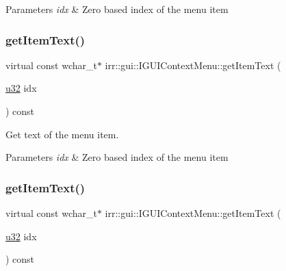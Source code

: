 \begin{DoxyParams}{Parameters}
{\em idx} & Zero based index of the menu item \\
\hline
\end{DoxyParams}
\mbox{\label{classirr_1_1gui_1_1IGUIContextMenu_a18cf836d001f425f617c5a36db3d1ae6}} 
\subsubsection{\texorpdfstring{get\+Item\+Text()}{getItemText()}\hspace{0.1cm}{\footnotesize\ttfamily [1/2]}}
{\footnotesize\ttfamily virtual const wchar\+\_\+t$\ast$ irr\+::gui\+::\+I\+G\+U\+I\+Context\+Menu\+::get\+Item\+Text (\begin{DoxyParamCaption}\item[{\hyperlink{namespaceirr_a0416a53257075833e7002efd0a18e804}{u32}}]{idx }\end{DoxyParamCaption}) const\hspace{0.3cm}{\ttfamily [pure virtual]}}



Get text of the menu item. 


\begin{DoxyParams}{Parameters}
{\em idx} & Zero based index of the menu item \\
\hline
\end{DoxyParams}
\mbox{\label{classirr_1_1gui_1_1IGUIContextMenu_a18cf836d001f425f617c5a36db3d1ae6}} 
\subsubsection{\texorpdfstring{get\+Item\+Text()}{getItemText()}\hspace{0.1cm}{\footnotesize\ttfamily [2/2]}}
{\footnotesize\ttfamily virtual const wchar\+\_\+t$\ast$ irr\+::gui\+::\+I\+G\+U\+I\+Context\+Menu\+::get\+Item\+Text (\begin{DoxyParamCaption}\item[{\hyperlink{namespaceirr_a0416a53257075833e7002efd0a18e804}{u32}}]{idx }\end{DoxyParamCaption}) const\hspace{0.3cm}{\ttfamily [pure virtual]}}



